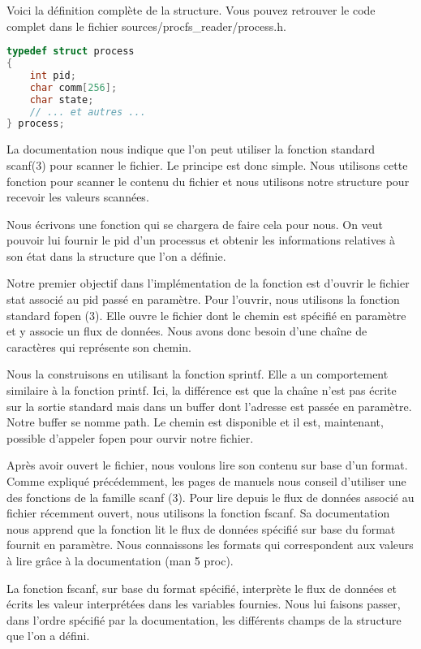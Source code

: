 \pagebreak
Voici la définition complète de la structure. Vous pouvez retrouver le code complet dans le fichier sources/procfs\_reader/process.h.

\begin{lstlisting}[frame=single, language=c]
typedef struct process
{
    int pid;
    char comm[256];
    char state;
    // ... et autres ...
} process;
\end{lstlisting}

La documentation nous indique que l’on peut utiliser la fonction standard scanf(3) pour scanner le fichier. Le principe est donc simple. Nous utilisons cette fonction pour scanner le contenu du fichier et nous utilisons notre structure pour recevoir les valeurs scannées. 

Nous écrivons une fonction qui se chargera de faire cela pour nous. On veut pouvoir lui fournir le pid d’un processus et obtenir les informations relatives à son état dans la structure que l'on a définie. 

Notre premier objectif dans l'implémentation de la fonction est d'ouvrir le fichier stat associé au pid passé en paramètre. Pour l'ouvrir, nous utilisons la fonction standard fopen (3). Elle ouvre le fichier dont le chemin est spécifié en paramètre et y associe un flux de données. Nous avons donc besoin d'une chaîne de caractères qui représente son chemin.

Nous la construisons en utilisant la fonction sprintf. Elle a un comportement similaire à la fonction printf. Ici, la différence est que la chaîne n'est pas écrite sur la sortie standard mais dans un buffer dont l'adresse est passée en paramètre. Notre buffer se nomme path. Le chemin est disponible et il est, maintenant, possible d'appeler fopen pour ourvir notre fichier.

Après avoir ouvert le fichier, nous voulons lire son contenu sur base d'un format. Comme expliqué précédemment, les pages de manuels nous conseil d'utiliser une des fonctions de la famille scanf (3). Pour lire depuis le flux de données associé au fichier récemment ouvert, nous utilisons la fonction fscanf. Sa documentation nous apprend que la fonction lit le flux de données spécifié sur base du format fournit en paramètre. Nous connaissons les formats qui correspondent aux valeurs à lire grâce à la documentation (man 5 proc).

La fonction fscanf, sur base du format spécifié, interprète le flux de données et écrits les valeur interprétées dans les variables fournies. Nous lui faisons passer, dans l'ordre spécifié par la documentation, les différents champs de la structure que l'on a défini.

